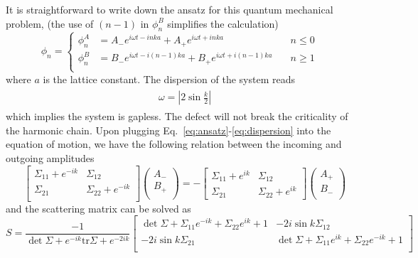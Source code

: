 It is straightforward to write down the ansatz for this quantum mechanical problem, (the use of $(n-1)$ in $\phi_n^B$ simplifies the calculation)
\begin{equation}
\label{eq:ansatz}
\phi_n
= \left\lbrace
  \begin{aligned}
    \phi_n^A &= A_{-} e^{i \omega t  - inka}  + A_{+} e^{i \omega t  + inka}  & \quad  n \le 0 \\
    \phi_n^B &= B_{-} e^{i \omega t  - i(n-1)ka}  + B_{+} e^{i \omega t  + i(n-1)ka} & \quad n \ge 1 \\
  \end{aligned} \right. 
 \quad 
\end{equation}
where $a$ is the lattice constant. The dispersion of the system reads
\begin{eqnarray}\begin{aligned}
\label{eq:dispersion}
\omega=\left|2\sin\frac{k}{2}\right|
\end{aligned}\end{eqnarray}
which implies the system is gapless. The defect will not break the criticality of the harmonic chain\cite{peschel_exact_2012}. Upon plugging Eq.~\eqref{eq:ansatz}-\eqref{eq:dispersion} into the equation of motion, we have the following relation between the incoming and outgoing amplitudes
\begin{equation}
\label{eq:discrete_S}
\begin{bmatrix}
\Sigma_{11} + e^{-ik} & \Sigma_{12} \\
\Sigma_{21} & \Sigma_{22}  + e^{-ik}  \\
\end{bmatrix}
\begin{pmatrix}
A_{-} \\
B_{+}\\
\end{pmatrix}
=-
\begin{bmatrix}
\Sigma_{11} +e^{ik} & \Sigma_{12}\\
\Sigma_{21} & \Sigma_{22} + e^{ik}
\end{bmatrix}
\begin{pmatrix}
A_{+}\\
B_{-}\\
\end{pmatrix}
\end{equation}
and the scattering matrix can be solved as
\begin{equation}
  S = \frac{-1}{ \det \Sigma  + e^{-ik} \text{tr} \Sigma   + e^{-2ik}}
\begin{bmatrix}
\det \Sigma+ \Sigma_{11} e^{-ik} + \Sigma_{22} e^{ik}+1  & -2i \sin k \Sigma_{12}  \\
-2i \sin k \Sigma_{21} &  \det \Sigma+ \Sigma_{11} e^{ik} + \Sigma_{22} e^{-ik}+1\\
\end{bmatrix}
\end{equation}
